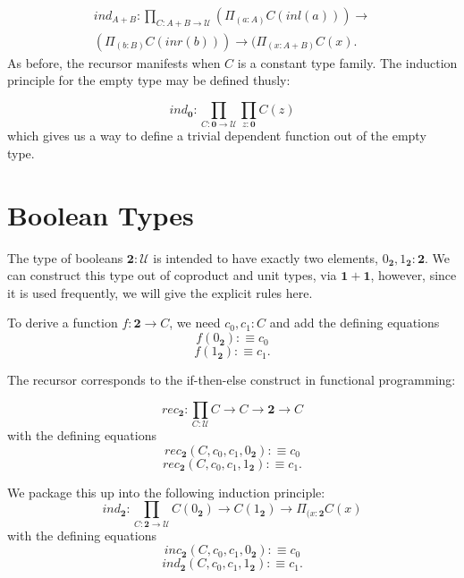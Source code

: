 \documentclass[letterpaper, 10 pt, conference]{ieeeconf}  %
\begin{document}
\begin{multline*}
    ind_{A+B} : \prod_{C : A + B \rightarrow \mathcal{U}} (\Pi_{(a:A)} C(inl(a))) \rightarrow \\
    (\Pi_{(b:B)} C(inr(b)))  \rightarrow (\Pi_{(x:A+B)} C(x).
\end{multline*}
As before, the recursor manifests when $C$ is a constant type family. The induction principle for the empty type may be defined thusly:

\begin{equation}
    ind_{\mathbf{0}} : \prod_{C : \mathbf{0} \rightarrow \mathcal{U}} \prod_{z:\mathbf{0}} C(z)
\end{equation}
which gives us a way to define a trivial dependent function out of the empty type.

\section{Boolean Types}

The type of booleans $\mathbf{2} : \mathcal{U}$ is intended to have exactly two elements, $0_{\mathbf{2}}, 1_{\mathbf{2}} : \mathbf{2}$. We can construct this type out of coproduct and unit types, via $\mathbf{1} + \mathbf{1}$, however, since it is used frequently, we will give the explicit rules here.

To derive a function $f: \mathbf{2} \rightarrow C$, we need $c_0,c_1 : C$ and add the defining equations 
\begin{equation*}
    f(0_{\mathbf{2}}) :\equiv c_0
\end{equation*}
\begin{equation*}
    f(1_{\mathbf{2}}) :\equiv c_1.
\end{equation*}

The recursor corresponds to the if-then-else construct in functional programming:

\begin{equation}
    rec_{\mathbf{2}} : \prod_{C:\mathcal{U}} C \rightarrow C \rightarrow \mathbf{2} \rightarrow C
\end{equation}
with the defining equations 
\begin{equation}
    rec_{\mathbf{2}}(C,c_0,c_1,0_{\mathbf{2}}) :\equiv c_0
\end{equation}
\begin{equation}
    rec_{\mathbf{2}}(C,c_0,c_1,1_{\mathbf{2}}) :\equiv c_1.
\end{equation}

We package this up into the following induction principle:
\begin{equation}
    ind_{\mathbf{2}} : \prod_{C: \mathbf{2} \rightarrow \mathcal{U}} C(0_{\mathbf{2}}) \rightarrow C(1_{\mathbf{2}}) \rightarrow \Pi_{(x:\mathbf{2}} C(x)
\end{equation}
with the defining equations 
\begin{equation}
    inc_{\mathbf{2}}(C,c_0,c_1,0_{\mathbf{2}}) :\equiv c_0
\end{equation}
\begin{equation}
    ind_{\mathbf{2}}(C,c_0,c_1,1_{\mathbf{2}}) :\equiv c_1.
\end{equation}
\end{document}
